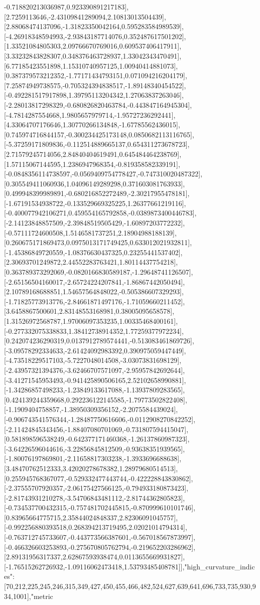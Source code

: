 \documentclass{article}
\begin{document}
-0.718820213036987,0.923390891217183],[2.7259113646,-2.43109841289094,2.10813013504439],[2.88068474137096,-1.31823350042164,0.595283584989539],[-4.26918348594993,-2.93843187714076,0.352487617501202],[1.33521084805303,2.09766670769016,0.609537406417911],[3.33232843828307,0.348376463728937,1.33042343470491],[6.77185423551898,1.15310740957125,1.00940414881073],[0.387379573212352,-1.77171434793151,0.071094216204179],[7.25874949738575,-0.705324394838517,-1.89148340454522],[-0.492281517917898,1.39795113204342,1.27063837263046],[-2.28013817298329,-0.680826820463784,-0.443847164945304],[-4.7814287554668,1.9805657979714,-1.95727236292441],[4.33064707176646,1.30770266134848,-1.67785562436015],[0.745974716844157,-0.300234425173148,0.0850682113116765],[-5.37259171809836,-0.112514889665137,0.654311273678723],[2.71579245714056,2.84840404619491,0.645484464238769],[1.57115067144595,1.2386947968354,-0.819358582339191],[-0.0848356114738597,-0.0569409754778427,-0.747310020487322],[0.305549411060936,1.04096149289298,0.371603081763933],[0.499948399989891,-0.680216852272489,-2.30217955478181],[-1.67191534938722,-0.133529669325225,1.26377661219116],[-0.400077942106271,0.459554165792858,-0.0389873400446783],[-2.14123848857509,-2.39848519505429,-1.60897203772232],[-0.57111724600508,1.5146581737251,2.18904988188139],[0.260675171869473,0.0975013171749425,0.633012021932811],[-1.45386849720559,-1.08376630437325,0.23255441537402],[2.30693701249872,2.44552283763421,1.80114437754218],[0.363789373292069,-0.0820166830589187,-1.29648741126507],[-2.65156504160017,-2.65724224207841,-1.86867442050494],[2.10789168688851,1.54657564848022,-0.505386607329293],[-1.71825773913776,-2.84661871497176,-1.71059660211452],[3.6458867500601,2.83148553168981,0.38005095658578],[1.31526972568787,1.97006097353235,1.00335468400161],[-0.277332075338833,1.38412738914352,1.77259377972234],[0.242074236290319,0.0137912789574441,-0.513083461869726],[-3.09578292334633,-2.61424092983392,0.390975059447449],[-4.73518229517103,-5.7227048014508,-3.03073831698129],[-2.43957321394376,-3.62466707571097,-2.95957842692644],[-3.41271545953493,-0.941425890506165,2.52102658990881],[-1.34286857498233,-1.23849133617088,-1.13937809283565],[0.424139244359668,0.292236122145585,-1.79773502822408],[-1.1909404758857,-1.38950309356152,-2.2075584439024],[-0.906743541576344,-1.28487750616606,-0.0112908270842252],[-2.11424845343456,-1.88407080701069,-0.731807594415047],[0.581898596538249,-0.642377171460368,-1.26137860987323],[-3.64226596044616,-3.22856845812509,-0.93638351939565],[-1.80076197869801,-2.11658817303238,-1.3933696688638],[3.48470762512333,3.42020278678382,1.28979680514513],[0.255945768367077,-0.529332477443744,-0.422228843830862],[-2.37555707920357,-2.06175427566125,-0.794933180873423],[-2.81743931210278,-3.54706843481112,-2.81744362805823],[-0.734537700432315,-0.757481702445815,-0.870999610101746],[0.83965664775715,2.35844024848337,2.82306091045757],[-0.992256880393518,0.268394213719495,2.02021014794314],[-0.763712745733607,-0.443773566387601,-0.567018567873997],[-0.466326603253893,-0.275670805762794,-0.219652203286962],[2.89131956317337,2.62867593938474,0.0113655669931827],[-1.76515262726932,-1.09116062473418,1.53793485408781]],"high_curvature_indices":[70,212,225,245,246,315,349,427,450,455,466,482,524,627,639,641,696,733,735,930,934,1001],"metric
\end{document}
